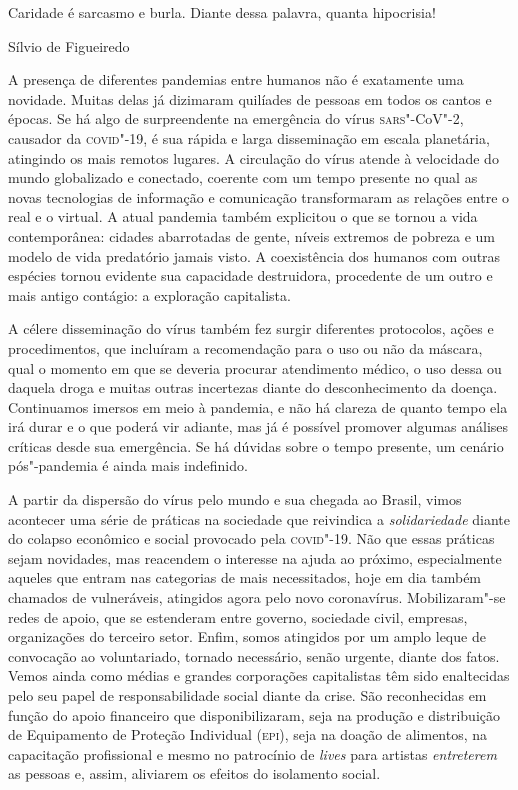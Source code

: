
\epigraph{Caridade é sarcasmo e burla. Diante dessa palavra, quanta
hipocrisia!}{Sílvio de Figueiredo}

A presença de diferentes pandemias entre humanos não é exatamente uma
novidade. Muitas delas já dizimaram quilíades de pessoas em todos os
cantos e épocas. Se há algo de surpreendente na emergência do vírus
\textsc{sars}"-CoV"-2, causador da \textsc{covid}"-19, é sua rápida e larga disseminação em
escala planetária, atingindo os mais remotos lugares. A circulação do
vírus atende à velocidade do mundo globalizado e conectado, coerente com
um tempo presente no qual as novas tecnologias de informação e
comunicação transformaram as relações entre o real e o virtual. A atual
pandemia também explicitou o que se tornou a vida contemporânea: cidades
abarrotadas de gente, níveis extremos de pobreza e um modelo de vida
predatório jamais visto. A coexistência dos humanos com outras espécies
tornou evidente sua capacidade destruidora, procedente de um outro e
mais antigo contágio: a exploração capitalista.

A célere disseminação do vírus também fez surgir diferentes protocolos,
ações e procedimentos, que incluíram a recomendação para o uso ou não da
máscara, qual o momento em que se deveria procurar atendimento médico, o
uso dessa ou daquela droga e muitas outras incertezas diante do
desconhecimento da doença. Continuamos imersos em meio à pandemia, e não
há clareza de quanto tempo ela irá durar e o que poderá vir adiante, mas
já é possível promover algumas análises críticas desde sua emergência.
Se há dúvidas sobre o tempo presente, um cenário pós"-pandemia é ainda
mais indefinido.

A partir da dispersão do vírus pelo mundo e sua chegada ao Brasil, vimos
acontecer uma série de práticas na sociedade que reivindica a
\emph{solidariedade} diante do colapso econômico e social provocado pela
\textsc{covid}"-19. Não que essas práticas sejam novidades, mas reacendem o
interesse na ajuda ao próximo, especialmente aqueles que entram nas
categorias de mais necessitados, hoje em dia também chamados de
vulneráveis, atingidos agora pelo novo coronavírus. Mobilizaram"-se redes
de apoio, que se estenderam entre governo, sociedade civil, empresas,
organizações do terceiro setor. Enfim, somos atingidos por um amplo
leque de convocação ao voluntariado, tornado necessário, senão urgente,
diante dos fatos. Vemos ainda como médias e grandes corporações
capitalistas têm sido enaltecidas pelo seu papel de responsabilidade
social diante da crise. São reconhecidas em função do apoio financeiro
que disponibilizaram, seja na produção e distribuição de Equipamento de
Proteção Individual (\textsc{epi}), seja na doação de alimentos, na capacitação
profissional e mesmo no patrocínio de \emph{lives} para artistas
\emph{entreterem} as pessoas e, assim, aliviarem os efeitos do
isolamento social.


